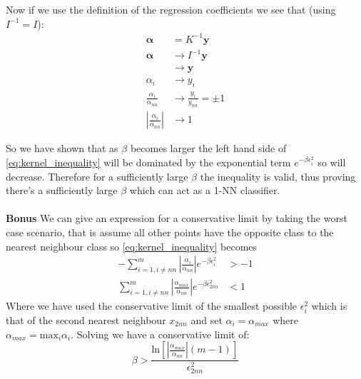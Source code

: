 \documentclass{article}
\begin{document}
\begin{enumerate}
\begin{enumerate}[label=\roman*.]
        \\\\
        Now if we use the definition of the regression coefficients we see that (using $I^{-1}=I$):
        \begin{align*}
            \mathbf{\alpha} &= K^{-1}\mathbf{y} \\
            \mathbf{\alpha} &\rightarrow I^{-1}\mathbf{y} \\
                            &\rightarrow \mathbf{y} \\
            \alpha_i &\rightarrow y_i \\
            \frac{\alpha_i}{\alpha_{nn}} &\rightarrow \frac{y_i}{y_{nn}} = \pm 1 \\
            \left|\frac{\alpha_i}{\alpha_{nn}}\right| &\rightarrow 1
        \end{align*}

        So we have shown that as $\beta$ becomes larger the left hand side of \eqref{eq:kernel_inequality} will be dominated by the exponential term $e^{-\beta\epsilon_i^2}$ so will decrease. Therefore for a sufficiently large $\beta$ the inequality is valid, thus proving there's a sufficiently large $\beta$ which can act as a 1-NN classifier.
        \\\\
        \textbf{Bonus}
        We can give an expression for a conservative limit by taking the worst case scenario, that is assume all other points have the opposite class to the nearest neighbour class so \eqref{eq:kernel_inequality} becomes
        \begin{align*}
            - \sum\limits_{i=1, i\ne nn}^m\left|\frac{\alpha_i}{\alpha_{nn}}\right|e^{-\beta\epsilon_i^2} &> -1 \nonumber \\
            \sum\limits_{i=1, i\ne nn}^m\left|\frac{\alpha_{max}}{\alpha_{nn}}\right|e^{-\beta\epsilon_{2nn}^2} &< 1
        \end{align*}
        Where we have used the conservative limit of the smallest possible $\epsilon_i^2$ which is that of the second nearest neighbour $x_{2nn}$ and set $\alpha_i = \alpha_{max}$ where $\alpha_{max} = \text{max}_i \alpha_i$. Solving we have a conservative limit of:
        \begin{equation*}
            \beta > \frac{\text{ln}\left[\left|\frac{\alpha_{max}}{\alpha_{nn}}\right|(m-1)\right]}{\epsilon_{2nn}^2}
        \end{equation*}

    \end{enumerate}


\end{enumerate}
\end{document}
